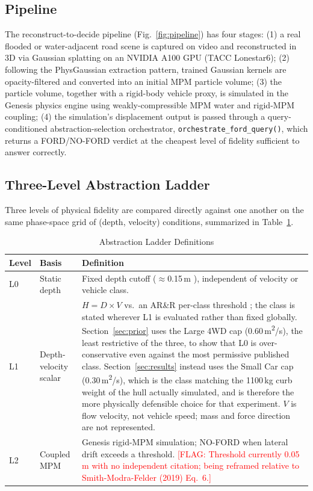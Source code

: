 \documentclass[conference]{IEEEtran}
\newcommand{\FLAG}[1]{\textcolor{red}{[FLAG: #1]}}
\begin{document}
\subsection{Pipeline}
The reconstruct-to-decide pipeline (Fig.~\ref{fig:pipeline}) has four stages: (1) a real flooded or water-adjacent road scene is captured on video and reconstructed in 3D via Gaussian splatting on an NVIDIA A100 GPU (TACC Lonestar6); (2) following the PhysGaussian extraction pattern, trained Gaussian kernels are opacity-filtered and converted into an initial MPM particle volume; (3) the particle volume, together with a rigid-body vehicle proxy, is simulated in the Genesis physics engine using weakly-compressible MPM water and rigid-MPM coupling; (4) the simulation's displacement output is passed through a query-conditioned abstraction-selection orchestrator, \texttt{orchestrate\_ford\_query()}, which returns a FORD/NO-FORD verdict at the cheapest level of fidelity sufficient to answer correctly.

\subsection{Three-Level Abstraction Ladder}
Three levels of physical fidelity are compared directly against one another on the same phase-space grid of (depth, velocity) conditions, summarized in Table~\ref{tab:ladder}.

\begin{table}[t]
\caption{Abstraction Ladder Definitions}
\label{tab:ladder}
\centering
\begin{tabular}{@{}p{0.3in}p{0.85in}p{1.95in}@{}}
\toprule
\textbf{Level} & \textbf{Basis} & \textbf{Definition} \\
\midrule
L0 & Static depth & Fixed depth cutoff ($\approx$0.15\,m \cite{nws_tadd}), independent of velocity or vehicle class. \\
L1 & Depth-velocity scalar & $H = D \times V$ vs.\ an AR\&R per-class threshold \cite{shand2011}; the class is stated wherever L1 is evaluated rather than fixed globally. Section~\ref{sec:prior} uses the Large 4WD cap (0.60\,m\textsuperscript{2}/s), the least restrictive of the three, to show that L0 is over-conservative even against the most permissive published class. Section~\ref{sec:results} instead uses the Small Car cap (0.30\,m\textsuperscript{2}/s), which is the class matching the 1100\,kg curb weight of the hull actually simulated, and is therefore the more physically defensible choice for that experiment. $V$ is flow velocity, not vehicle speed; mass and force direction are not represented. \\
L2 & Coupled MPM & Genesis rigid-MPM simulation; NO-FORD when lateral drift exceeds a threshold. \FLAG{Threshold currently 0.05\,m with no independent citation; being reframed relative to Smith-Modra-Felder (2019) Eq.~6.} \\
\bottomrule
\end{tabular}
\end{table}
\end{document}
